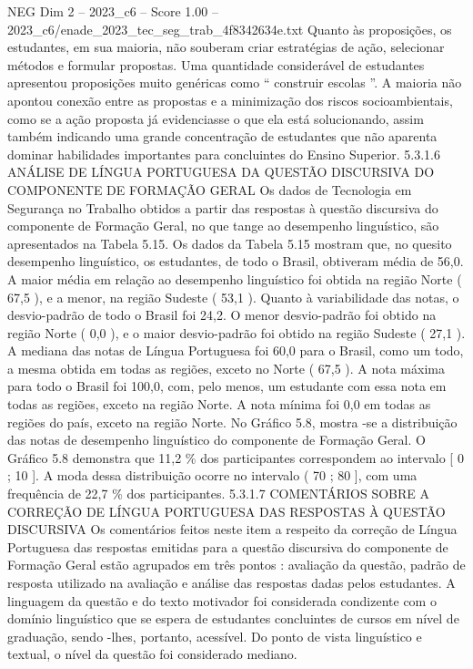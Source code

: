 \begin{textsample}{NEG Dim 2 – 2023\_c6 – Score 1.00 – 2023\_c6/enade\_2023\_tec\_seg\_trab\_4f8342634e.txt}
Quanto às proposições, os estudantes, em sua maioria, não souberam criar estratégias de ação, selecionar métodos e formular propostas.
Uma quantidade considerável de estudantes apresentou proposições muito genéricas como “ construir escolas ”.
A maioria não apontou conexão entre as propostas e a minimização dos riscos socioambientais, como se a ação proposta já evidenciasse o que ela está solucionando, assim também indicando uma grande concentração de estudantes que não aparenta dominar habilidades importantes para concluintes do Ensino Superior. 5.3.1.6 ANÁLISE DE LÍNGUA PORTUGUESA DA QUESTÃO DISCURSIVA DO COMPONENTE DE FORMAÇÃO GERAL Os dados de Tecnologia em Segurança no Trabalho obtidos a partir das respostas à questão discursiva do componente de Formação Geral, no que tange ao desempenho linguístico, são apresentados na Tabela 5.15.
Os dados da Tabela 5.15 mostram que, no quesito desempenho linguístico, os estudantes, de todo o Brasil, obtiveram média de 56,0.
A maior média em relação ao desempenho linguístico foi obtida na região Norte ( 67,5 ), e a menor, na região Sudeste ( 53,1 ).
Quanto à variabilidade das notas, o desvio-padrão de todo o Brasil foi 24,2.
O menor desvio-padrão foi obtido na região Norte ( 0,0 ), e o maior desvio-padrão foi obtido na região Sudeste ( 27,1 ).
A mediana das notas de Língua Portuguesa foi 60,0 para o Brasil, como um todo, a mesma obtida em todas as regiões, exceto no Norte ( 67,5 ).
A nota máxima para todo o Brasil foi 100,0, com, pelo menos, um estudante com essa nota em todas as regiões, exceto na região Norte.
A nota mínima foi 0,0 em todas as regiões do país, exceto na região Norte.
No Gráfico 5.8, mostra -se a distribuição das notas de desempenho linguístico do componente de Formação Geral.
O Gráfico 5.8 demonstra que 11,2 \% dos participantes correspondem ao intervalo [ 0 ; 10 ].
A moda dessa distribuição ocorre no intervalo ( 70 ; 80 ], com uma frequência de 22,7 \% dos participantes. 5.3.1.7 COMENTÁRIOS SOBRE A CORREÇÃO DE LÍNGUA PORTUGUESA DAS RESPOSTAS À QUESTÃO DISCURSIVA Os comentários feitos neste item a respeito da correção de Língua Portuguesa das respostas emitidas para a questão discursiva do componente de Formação Geral estão agrupados em três pontos : avaliação da questão, padrão de resposta utilizado na avaliação e análise das respostas dadas pelos estudantes.
A linguagem da questão e do texto motivador foi considerada condizente com o domínio linguístico que se espera de estudantes concluintes de cursos em nível de graduação, sendo -lhes, portanto, acessível.
Do ponto de vista linguístico e textual, o nível da questão foi considerado mediano.

\end{textsample}
